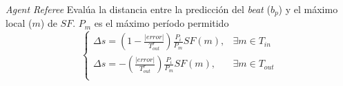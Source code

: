 \documentclass[slidestop,compress,mathserif,xcolor=svgnames,table]{beamer}
\begin{document}
\begin{frame}
\begin{columns}
\begin{scriptsize}
\pause
\end{scriptsize}
\end{columns}
\vspace*{-10pt}
\begin{scriptsize}
\begin{block}{\emph{Agent Referee}}
Evalúa la distancia entre la predicción del \emph{beat} ($b_p$) y el máximo local ($m$) de $SF$. $P_m$ es el máximo período permitido
$$\begin{cases}
\Delta s = \left(1-\frac{|error|}{T^r_{out}} \right)\frac{P_i}{P_m}SF(m), & \exists m \in T_{in}\\
\Delta s = -\left(\frac{|error|}{T^r_{out}} \right)\frac{P_i}{P_m}SF(m), & \exists m \in T_{out}\\
\end{cases}$$
\end{block}
\end{scriptsize}

\end{frame}
\end{document}
